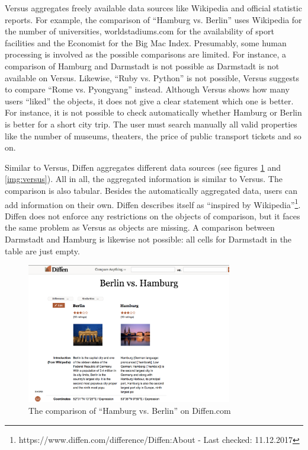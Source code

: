 Versus aggregates freely available data sources like Wikipedia and official statistic reports. For example, the comparison of \enquote{Hamburg vs. Berlin} uses Wikipedia for the number of universities, worldstadiums.com for the availability of sport facilities and the Economist for the Big Mac Index. Presumably, some human processing is involved as the possible comparisons are limited. For instance, a comparison of Hamburg and Darmstadt is not possible as Darmstadt is not available on Versus. Likewise, \enquote{Ruby vs. Python} is not possible, Versus suggests to compare \enquote{Rome vs. Pyongyang} instead. Although Versus shows how many users \enquote{liked} the objects, it does not give a clear statement which one is better. For instance, it is not possible to check automatically whether Hamburg or Berlin is better for a short city trip. The user must search manually all valid properties like the number of museums, theaters, the price of public transport tickets and so on.

Similar to Versus, Diffen aggregates different data sources (see figures \ref{img:diffen} and \ref{img:versus}). All in all, the aggregated information is similar to Versus. The comparison is also tabular. Besides the automatically aggregated data, users can add information on their own. Diffen describes itself as \enquote{inspired by Wikipedia}\footnote{https://www.diffen.com/difference/Diffen:About - Last checked: 11.12.2017}. Diffen does not enforce any restrictions on the objects of comparison, but it faces the same problem as Versus as objects are missing. A comparison between Darmstadt and Hamburg is likewise not possible: all cells for Darmstadt in the table are just empty.

\begin{figure}[ht]
 \centering
	\includegraphics[width=0.8\textwidth]{images/ds-sys/diffen}
	\caption{The comparison of \enquote{Hamburg vs. Berlin} on Diffen.com}
		\label{img:diffen}
\end{figure}

